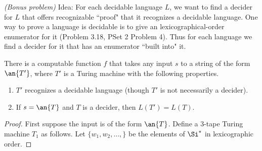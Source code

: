 \begin{problem}{\it(Bonus problem)}
Idea: For each decidable language $L$, we want to find a decider for $L$ that offers recognizable ``proof" that it recognizes a decidable language. One way to prove a language is decidable is to give an lexicographical-order enumerator for it (Problem 3.18, PSet 2 Problem 4). Thus for each language we find a decider for it that has an enumerator ``built into" it.

\begin{lem}
There is a computable function $f$ that takes any input $s$ to a string of the form $\an{T'}$, where $T'$ is a Turing machine with the following properties.
\begin{enumerate}
\item
$T'$ recognizes a decidable language (though $T'$ is not necessarily a decider).
\item
If $s=\an{T}$ and $T$ is a decider, then $L(T')=L(T)$.
\end{enumerate}
\end{lem}
\begin{proof}
First suppose the input is of the form $\an{T}$. Define a 3-tape Turing machine $T_1$ as follows. Let $\{w_1,w_2,\ldots,\}$ be the elements of $\Si^*$ in lexicographic order.


\end{proof}
\end{problem}
